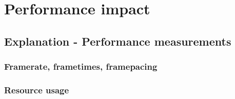 
\chapter{Performance impact}

\section{Explanation - Performance measurements}
\subsection{Framerate, frametimes, framepacing}
\subsection{Resource usage}